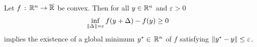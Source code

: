 \begin{lemma}
  \label{syu_1_result}
  Let 
  $f \,:\, \mathbb{R}^n \to \overline{\mathbb{R}}$ 
  be convex.
  Then 
  for all $y \in \mathbb{R}^n$ and $\varepsilon>0$ 
    \begin{gather}
      \label{7060_0}
      \inf_{\left\lVert\Delta\right\rVert=\varepsilon} f(y+\Delta) - f(y) \ge 0 \quad
    \end{gather}
    implies
    the existence of  
    a global minimum
    $
    y^* \in \,\mathbb{R}^n
    $
    of $f$
    satisfying
    $
      \left\lVert y^* - y\right\rVert \le \varepsilon
    $.
\end{lemma}
